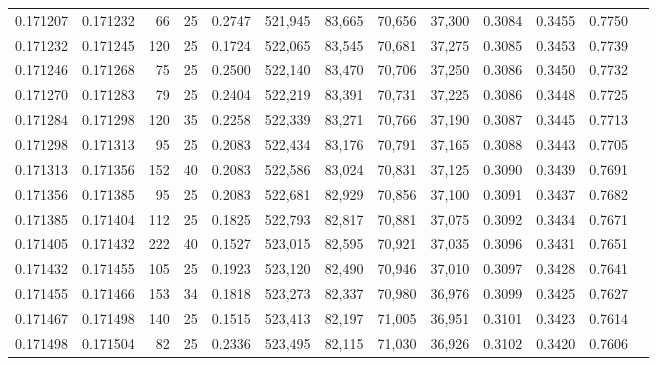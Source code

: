 \begin{tabular}{rrrrrrrrrrrrr}
0.171207 & 0.171232 &  66 &  25 &                                     0.2747 & 521,945 &  83,665 &  70,656 &  37,300 & 0.3084 & 0.3455 & 0.7750 \\
0.171232 & 0.171245 & 120 &  25 &                                     0.1724 & 522,065 &  83,545 &  70,681 &  37,275 & 0.3085 & 0.3453 & 0.7739 \\
0.171246 & 0.171268 &  75 &  25 &                                     0.2500 & 522,140 &  83,470 &  70,706 &  37,250 & 0.3086 & 0.3450 & 0.7732 \\
0.171270 & 0.171283 &  79 &  25 &                                     0.2404 & 522,219 &  83,391 &  70,731 &  37,225 & 0.3086 & 0.3448 & 0.7725 \\
0.171284 & 0.171298 & 120 &  35 &                                     0.2258 & 522,339 &  83,271 &  70,766 &  37,190 & 0.3087 & 0.3445 & 0.7713 \\
0.171298 & 0.171313 &  95 &  25 &                                     0.2083 & 522,434 &  83,176 &  70,791 &  37,165 & 0.3088 & 0.3443 & 0.7705 \\
0.171313 & 0.171356 & 152 &  40 &                                     0.2083 & 522,586 &  83,024 &  70,831 &  37,125 & 0.3090 & 0.3439 & 0.7691 \\
0.171356 & 0.171385 &  95 &  25 &                                     0.2083 & 522,681 &  82,929 &  70,856 &  37,100 & 0.3091 & 0.3437 & 0.7682 \\
0.171385 & 0.171404 & 112 &  25 &                                     0.1825 & 522,793 &  82,817 &  70,881 &  37,075 & 0.3092 & 0.3434 & 0.7671 \\
0.171405 & 0.171432 & 222 &  40 &                                     0.1527 & 523,015 &  82,595 &  70,921 &  37,035 & 0.3096 & 0.3431 & 0.7651 \\
0.171432 & 0.171455 & 105 &  25 &                                     0.1923 & 523,120 &  82,490 &  70,946 &  37,010 & 0.3097 & 0.3428 & 0.7641 \\
0.171455 & 0.171466 & 153 &  34 &                                     0.1818 & 523,273 &  82,337 &  70,980 &  36,976 & 0.3099 & 0.3425 & 0.7627 \\
0.171467 & 0.171498 & 140 &  25 &                                     0.1515 & 523,413 &  82,197 &  71,005 &  36,951 & 0.3101 & 0.3423 & 0.7614 \\
0.171498 & 0.171504 &  82 &  25 &                                     0.2336 & 523,495 &  82,115 &  71,030 &  36,926 & 0.3102 & 0.3420 & 0.7606 \\

\end{tabular}
